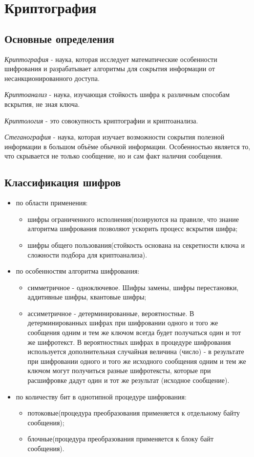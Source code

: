 \documentclass{article}
\begin{document}
\section { Криптография }
\subsection{ Основные определения }
\textit{Криптография} - наука, которая исследует математические особенности шифрования и разрабатывает алгоритмы для сокрытия информации от несанкционированного доступа.

\textit{Криптоанализ} - наука, изучающая стойкость шифра к различным способам вскрытия, не зная ключа.

\textit{Криптология} - это совокупность криптографии и криптоанализа.

\textit{Стеганография} - наука, которая изучает возможности сокрытия полезной информации в большом объёме обычной информации. Особенностью является то, что скрывается не только сообщение, но и сам факт наличия сообщения.

\subsection{ Классификация шифров }
\begin{itemize}
\item по области применения:
\begin{itemize}
\item шифры ограниченного исполнения(позируются на правиле, что знание алгоритма шифрования позволяют ускорить процесс вскрытия шифра;
\item шифры общего пользования(стойкость основана на секретности ключа и сложности подбора для криптоанализа).
\end{itemize}
\item по особенностям алгоритма шифрования:
\begin{itemize}
\item симметричное - одноключевое. Шифры замены, шифры перестановки, аддитивные шифры, квантовые шифры;
\item ассиметричное - детерминированные, вероятностные. В детерминированных шифрах при шифровании одного и того же сообщения одним и тем же ключом всегда будет получаться один и тот же шифротекст. В вероятностных шифрах в процедуре шифрования используется дополнительная случайная величина (число) - в результате при шифровании одного и того же исходного сообщения одним и тем же ключом могут получиться разные шифротексты, которые при расшифровке дадут один и тот же результат (исходное сообщение).
\end{itemize}
\item по количеству бит в однотипной процедуре шифрования:
\begin{itemize}
\item потоковые(процедура преобразования применяется к отдельному байту сообщения);
\item блочные(процедура преобразования применяется к блоку байт сообщения).
\end{itemize}
\end{itemize}
\end{document}

